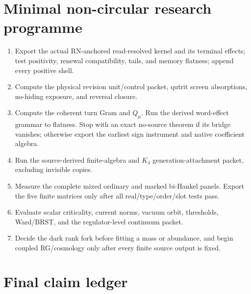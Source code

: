 \documentclass[11pt,oneside,openany]{book}
\numberwithin{equation}{chapter}
\theoremstyle{definition}
\theoremstyle{remark}
\begin{document}
\chapter{Minimal non-circular research programme}
\label{ch:research-programme}

\begin{enumerate}[label=\textup{(W\arabic*)},leftmargin=2.8em]
\item Export the actual RN-anchored read-resolved kernel and its terminal
      effects; test positivity, renewal compatibility, tails, and memory
      flatness; append every positive shell.
\item Compute the physical revision unit/control packet, qutrit screen
      absorptions, no-hiding exposure, and reversal closure.
\item Compute the coherent turn Gram and \(Q_\mu\).  Run the derived word-effect
      grammar to flatness.  Stop with an exact no-source theorem if its bridge
      vanishes; otherwise export the earliest sign instrument and native
      coefficient algebra.
\item Run the source-derived finite-algebra and \(K_4\) generation-attachment
      packet, excluding invisible copies.
\item Measure the complete mixed ordinary and marked bi-Hankel panels.  Export
      the five finite matrices only after all real/type/order/slot tests pass.
\item Evaluate scalar criticality, current norms, vacuum orbit, thresholds,
      Ward/BRST, and the regulator-level continuum packet.
\item Decide the dark rank fork before fitting a mass or abundance, and begin
      coupled RG/cosmology only after every finite source output is fixed.
\end{enumerate}

\chapter{Final claim ledger}
\label{ch:final-ledger}
\end{document}
